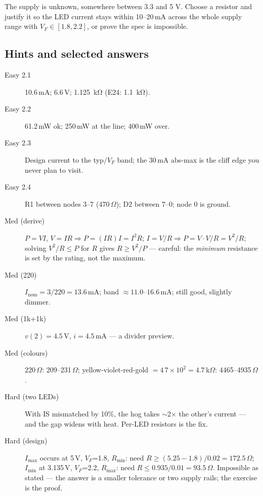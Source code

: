 \begin{exercise}
The supply is unknown, somewhere between 3.3 and 5 V. Choose a resistor and
justify it so the LED current stays within 10--20\,mA across the whole supply
range with $V_F \in [1.8, 2.2]$, or prove the spec is impossible.
\end{exercise}

\subsection*{Hints and selected answers}

\begin{description}
\item[Easy 2.1] 10.6\,mA; 6.6\,V; \qty{1.125}{\kilo\ohm} (E24: \qty{1.1}{\kilo\ohm}).
\item[Easy 2.2] 61.2\,mW ok; 250\,mW at the line; 400\,mW over.
\item[Easy 2.3] Design current to the typ/$V_F$ band; the 30\,mA abs-max is the cliff edge you never plan to visit.
\item[Easy 2.4] R1 between nodes 3--7 (470\,$\Omega$); D2 between 7--0; node 0 is ground.
\item[Med (derive)] $P=VI$, $V=IR \Rightarrow P=(IR)I=I^2R$; $I=V/R \Rightarrow P=V\cdot V/R=V^2/R$; solving $V^2/R \le P$ for $R$ gives $R \ge V^2/P$ — careful: the \emph{minimum} resistance is set by the rating, not the maximum.
\item[Med (220)] $I_{\mathrm{nom}} = 3/220 = 13.6$\,mA; band $\approx 11.0$--$16.6$\,mA; still good, slightly dimmer.
\item[Med (1k+1k)] $v(2)=4.5$\,V, $i=4.5$\,mA — a divider preview.
\item[Med (colours)] 220\,$\Omega$: 209--231\,$\Omega$; yellow-violet-red-gold $=4\,7\times10^2=4.7$\,k$\Omega$: 4465--4935\,$\Omega$.
\item[Hard (two LEDs)] With IS mismatched by 10\%, the hog takes $\sim$2$\times$ the other's current — and the gap widens with heat. Per-LED resistors is the fix.
\item[Hard (design)] $I_{\max}$ occurs at 5\,V, $V_F$=1.8, $R_{\min}$: need $R\ge(5.25-1.8)/0.02=172.5\,\Omega$; $I_{\min}$ at 3.135\,V, $V_F$=2.2, $R_{\max}$: need $R\le0.935/0.01=93.5\,\Omega$. Impossible as stated — the answer is a smaller tolerance or two supply rails; the exercise is the proof.
\end{description}

